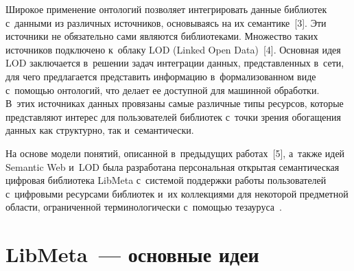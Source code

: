 \begin{multicols}{2}
     Широкое применение онтологий позволяет интегри\-ровать данные 
библиотек с~данными из различных источников, основываясь на их 
семантике~[3]. Эти источники не обязательно сами являются библиотеками. 
Множество таких источников подключено к~облаку LOD (Linked Open 
Data)~[4]. Основная идея LOD заключается в~решении задач интеграции 
данных, представленных в~сети, для чего предлагается представить 
информацию в~формализованном виде с~по\-мощью онтологий, что делает ее 
доступной для машинной обработки. В~этих источниках данных провязаны 
самые различные типы ресурсов, которые представляют интерес для 
пользователей библиотек с~точки зрения обогащения данных как структурно, 
так и~семантически.
     
     На основе модели понятий, описанной в~предыду\-щих работах~[5], 
а~также идей Semantic Web и~LOD была разработана 
персональная открытая семантическая циф\-ро\-вая библиотека \mbox{LibMeta} 
с~системой поддержки работы пользователей с~циф\-ро\-вы\-ми ресурсами 
библиотек и~их коллекциями для некоторой предметной области, 
ограниченной терминологически с~помощью тезауруса~\cite{3-ser, 6-ser}.

\vspace*{-4pt}
     
\section{LibMeta~--- основные идеи}

\vspace*{-2pt}


\end{multicols}
